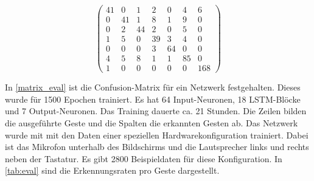 \begin{center}
\begin{equation}
\label{matrix_eval}
\begin{pmatrix}
41 & 0 & 1 & 2 & 0 & 4 & 6\\
0 & 41 & 1 & 8 & 1 & 9 & 0\\
0 & 2 & 44 & 2 & 0 & 5 & 0 \\
1 & 5 & 0 & 39 & 3 & 4 & 0 \\
0 & 0 & 0 & 3 & 64 & 0 & 0 \\
4 & 5 & 8 & 1 & 1 & 85 & 0 \\
1 & 0 & 0 & 0 & 0 & 0 & 168
\end{pmatrix}
\end{equation}
\end{center}

In \autoref{matrix_eval} ist die Confusion-Matrix für ein Netzwerk festgehalten.
Dieses wurde für 1500 Epochen trainiert. Es hat 64 Input-Neuronen, 18
\ac{LSTM}-Blöcke und 7 Output-Neuronen. Das Training dauerte ca. 21 Stunden. Die
Zeilen bilden die ausgeführte Geste und die Spalten die erkannten Gesten ab. Das
Netzwerk wurde mit mit den Daten einer speziellen Hardwarekonfiguration
trainiert. Dabei ist das Mikrofon unterhalb des Bildschirms und die Lautsprecher
links und rechts neben der Tastatur. Es gibt 2800 Beispieldaten für diese Konfiguration. 
In \autoref{tab:eval} sind die Erkennungsraten pro Geste dargestellt.



